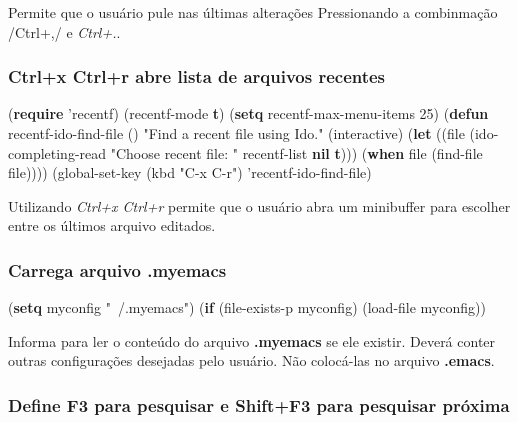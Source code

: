 \documentclass[]{article}
\newenvironment{Shaded}{}{}
\newcommand{\KeywordTok}[1]{\textcolor[rgb]{0.00,0.44,0.13}{\textbf{{#1}}}}
\newcommand{\DecValTok}[1]{\textcolor[rgb]{0.25,0.63,0.44}{{#1}}}
\newcommand{\StringTok}[1]{\textcolor[rgb]{0.25,0.44,0.63}{{#1}}}
\newcommand{\FunctionTok}[1]{\textcolor[rgb]{0.02,0.16,0.49}{{#1}}}
\newcommand{\NormalTok}[1]{{#1}}
\begin{document}
Permite que o usuário pule nas últimas alterações Pressionando a
combinmação /Ctrl+,/ e \emph{Ctrl+.}.

\subsubsection{Ctrl+x Ctrl+r abre lista de arquivos
recentes}\label{ctrlx-ctrlr-abre-lista-de-arquivos-recentes}

\begin{Shaded}
\begin{Highlighting}[]
\NormalTok{(}\KeywordTok{require} \NormalTok{'recentf)}
\NormalTok{(recentf-mode }\KeywordTok{t}\NormalTok{)}
\NormalTok{(}\KeywordTok{setq} \NormalTok{recentf-max-menu-items }\DecValTok{25}\NormalTok{)}
\NormalTok{(}\KeywordTok{defun}\FunctionTok{ recentf-ido-find-file }\NormalTok{()}
  \StringTok{"Find a recent file using Ido."}
  \NormalTok{(interactive)}
  \NormalTok{(}\KeywordTok{let} \NormalTok{((file (ido-completing-read }\StringTok{"Choose recent file: "}
    \NormalTok{recentf-list }\KeywordTok{nil} \KeywordTok{t}\NormalTok{)))}
    \NormalTok{(}\KeywordTok{when} \NormalTok{file}
      \NormalTok{(find-file file))))}
\NormalTok{(global-set-key (kbd }\StringTok{"C-x C-r"}\NormalTok{) 'recentf-ido-find-file)}
\end{Highlighting}
\end{Shaded}

Utilizando \emph{Ctrl+x Ctrl+r} permite que o usuário abra um minibuffer
para escolher entre os últimos arquivo editados.

\subsubsection{Carrega arquivo .myemacs}\label{carrega-arquivo-.myemacs}

\begin{Shaded}
\begin{Highlighting}[]
\NormalTok{(}\KeywordTok{setq} \NormalTok{myconfig }\StringTok{"~/.myemacs"}\NormalTok{)}
\NormalTok{(}\KeywordTok{if} \NormalTok{(file-exists-p myconfig)}
    \NormalTok{(load-file myconfig))}
\end{Highlighting}
\end{Shaded}

Informa para ler o conteúdo do arquivo \textbf{.myemacs} se ele existir.
Deverá conter outras configurações desejadas pelo usuário. Não
colocá-las no arquivo \textbf{.emacs}.

\subsubsection{Define F3 para pesquisar e Shift+F3 para pesquisar
próxima}\label{define-f3-para-pesquisar-e-shiftf3-para-pesquisar-pruxf3xima}
\end{document}
